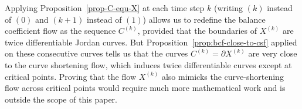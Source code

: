 \documentclass[smallextended]{svjour3}
\begin{document}
Applying Proposition~\ref{prop-C-equ-X} at each time step $k$ (writing
$(k)$ instead of $(0)$ and $(k+1)$ instead of $(1)$) allows us to
redefine the balance coefficient flow as the sequence $C^{(k)}$,
provided that the boundaries of $X^{(k)}$ are twice differentiable
Jordan curves. But Proposition~\ref{prop:bcf-close-to-csf} applied on
these consecutive curves tells us that the curves $C^{(k)}=\partial
X^{(k)}$ are very close to the curve shortening flow, which induces
twice differentiable curves except at critical points. Proving that
the flow $X^{(k)}$ also mimicks the curve-shortening flow across
critical points would require much more mathematical work and is
outside the scope of this paper.

	
\end{document}
